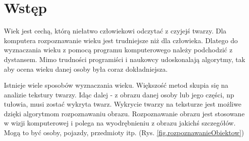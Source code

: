 \documentclass[a4paper,twoside,12pt]{book}
\newcounter{stronyPozaNumeracja}
\begin{document}
    \vfill




    \cleardoublepage


    \pagestyle{tylkoNumeryStron}
    \tableofcontents

    \setcounter{stronyPozaNumeracja}{\value{page}}
    \mainmatter
    \pagestyle{NumeryStronNazwyRozdzialow}


    \chapter{Wstęp}

    Wiek jest cechą, którą niełatwo człowiekowi odczytać z czyjejś twarzy.
    Dla komputera rozpoznawanie wieku jest
    trudniejsze niż dla człowieka.
    Dlatego do wyznaczania wieku z pomocą programu komputerowego należy podchodzić z dystansem.
    Mimo trudności programiści
    i naukowcy udoskonalają algorytmy,
    tak aby ocena wieku danej osoby była coraz dokładniejsza.

    Istnieje wiele sposobów wyznaczania wieku.
    Większość metod skupia się na analizie tekstury twarzy.
    Idąc dalej - z obrazu danej osoby lub jego części, np tułowia,
    musi zostać wykryta twarz.
    Wykrycie twarzy na teksturze jest możliwe dzięki algorytmom rozpoznawaniu obrazu.
    Rozpoznawanie obrazu jest stosowane w wizji komputerowej i polega na wyodrębnieniu z obrazu jakichś szczegółów.
    Mogą
    to być osoby, pojazdy, przedmioty itp. (Rys. \ref{fig.rozpoznawanieObiektow})
\end{document}

